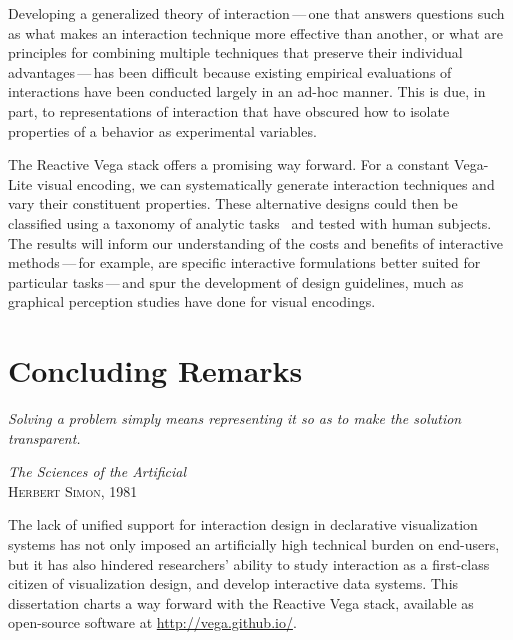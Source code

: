 Developing a generalized theory of interaction\,---\,one that answers questions
such as what makes an interaction technique more effective than another, or what
are principles for combining multiple techniques that preserve their individual
advantages\,---\,has been difficult because existing empirical evaluations of
interactions have been conducted largely in an ad-hoc manner. This is due, in
part, to representations of interaction that have obscured how to isolate
properties of a behavior as experimental variables.

The Reactive Vega stack offers a promising way forward. For a constant Vega-Lite
visual encoding, we can systematically generate interaction techniques and vary
their constituent properties. These alternative designs could then be classified
using a taxonomy of analytic tasks~\cite{brehmer:taxonomy} and tested with human
subjects. The results will inform our understanding of the costs and benefits of
interactive methods\,---\,for example, are specific interactive formulations
better suited for particular tasks\,---\,and spur the development of design
guidelines, much as graphical perception studies have done for visual encodings.

\vspace{-10pt}

\section{Concluding Remarks}

\vspace{-10pt}

\setlength{}
\epigraph{\textit{Solving a problem simply means representing it so as to make
the solution transparent.}} {\textit{The Sciences of the
Artificial}\\\textsc{Herbert Simon, 1981}}

The lack of unified support for interaction design in declarative visualization
systems has not only imposed an artificially high technical burden on end-users,
but it has also hindered researchers' ability to study interaction as a
first-class citizen of visualization design, and develop interactive data
systems. This dissertation charts a way forward with the Reactive Vega stack,
available as open-source software at \url{http://vega.github.io/}.